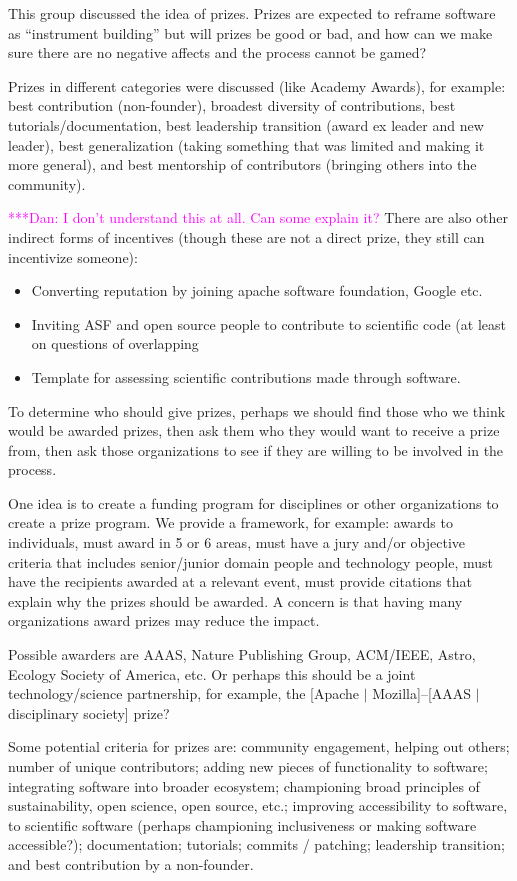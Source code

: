 \documentclass[11pt, oneside]{amsart}
\newcommand{\katznote}[1]{ {\textcolor{magenta}    { ***Dan:      #1 }}}
\begin{document}
This group discussed the idea of prizes.  Prizes are expected to reframe software
as ``instrument building'' but will prizes be good or bad, and how can we make sure
there are no negative affects and the process cannot be gamed?
  
Prizes in different categories were discussed (like Academy Awards), for example:
best contribution (non-founder),
broadest diversity of contributions,
best tutorials/documentation,
best leadership transition (award ex leader and new leader),
best generalization (taking something that was limited and making it more general), and
best mentorship of contributors (bringing others into the community).
 
\katznote{I don't understand this at all.  Can some explain it?}
There are also other indirect forms of incentives
(though these are not a direct prize, they still can incentivize someone):
\begin{itemize}
\item Converting reputation by joining apache software foundation, Google etc. 
\item Inviting ASF and open source people to contribute to scientific code (at least on questions of overlapping
\item Template for assessing scientific contributions made through software.   
\end{itemize}

To determine who should give prizes, perhaps we should find those who we think would
be awarded prizes, then ask them who they would want to receive a prize from, then
ask those organizations to see if they are willing to be involved in the process.

One idea is to create a funding program for disciplines or other organizations to
create a prize program.  We provide a framework, for example: awards to individuals, must
award in 5 or 6 areas, must have a jury and/or objective criteria that includes
senior/junior domain people and technology people, must have the recipients awarded
at a relevant event, must provide citations that explain why the prizes should be awarded.
A concern is that having many organizations award prizes may reduce the impact.

Possible awarders are AAAS, Nature Publishing Group, ACM/IEEE, Astro, Ecology Society of America, etc.  Or perhaps this should be a joint technology/science partnership, for example, the [Apache $|$ Mozilla]--[AAAS $|$ disciplinary society] prize?

Some potential criteria for prizes are:
community engagement, helping out others;
number of unique contributors;
adding new pieces of functionality to software;
integrating software into broader ecosystem; championing broad principles of sustainability, open science, open source, etc.;
improving accessibility to software, to scientific software (perhaps championing inclusiveness or making software accessible?);
documentation;
tutorials;
commits / patching;
leadership transition; and
best contribution by a non-founder.
\end{document}
